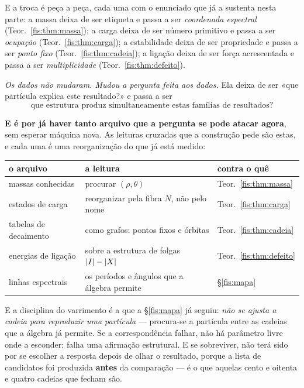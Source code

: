 \documentclass[livro.tex]{subfiles}
\begin{document}
\medskip\noindent E a troca é peça a peça, cada uma com o enunciado que já a
sustenta nesta parte: a massa deixa de ser etiqueta e passa a ser
\emph{coordenada espectral} (Teor.~\ref{fis:thm:massa}); a carga deixa de ser
número primitivo e passa a ser \emph{ocupação} (Teor.~\ref{fis:thm:carga}); a
estabilidade deixa de ser propriedade e passa a ser \emph{ponto fixo}
(Teor.~\ref{fis:thm:cadeia}); a ligação deixa de ser força acrescentada e passa a
ser \emph{multiplicidade} (Teor.~\ref{fis:thm:defeito}).

\medskip\noindent\emph{Os dados não mudaram. Mudou a pergunta feita aos dados.}
Ela deixa de ser «que partícula explica este resultado?» e passa a ser
\[
\boxed{\;\text{que estrutura produz simultaneamente estas famílias de resultados?}\;}
\]

\medskip\noindent\textbf{E é por já haver tanto arquivo que a pergunta se pode
atacar agora}, sem esperar máquina nova. As leituras cruzadas que a construção
pede são estas, e cada uma é uma reorganização do que já está medido:

\begin{center}\small
\begin{tabular}{@{}lll@{}}
\toprule
o arquivo & a leitura & contra o quê \\
\midrule
massas conhecidas & procurar $(\rho,\theta)$ & Teor.~\ref{fis:thm:massa} \\
estados de carga & reorganizar pela fibra $N$, não pelo nome & Teor.~\ref{fis:thm:carga} \\
tabelas de decaimento & como grafos: pontos fixos e órbitas & Teor.~\ref{fis:thm:cadeia} \\
energias de ligação & sobre a estrutura de folgas $\lvert I\rvert-\lvert X\rvert$ & Teor.~\ref{fis:thm:defeito} \\
linhas espectrais & os períodos e ângulos que a álgebra permite & §\ref{fis:mapa} \\
\bottomrule
\end{tabular}
\end{center}

\medskip\noindent E a disciplina do varrimento é a que a §\ref{fis:mapa} já
seguiu: \emph{não se ajusta a cadeia para reproduzir uma partícula} --- procura-se
a partícula entre as cadeias que a álgebra já permite. Se a correspondência
falhar, não há parâmetro livre onde a esconder: falha uma afirmação estrutural. E
se sobreviver, não terá sido por se escolher a resposta depois de olhar o
resultado, porque a lista de candidatos foi produzida \textbf{antes} da
comparação --- é o que aquelas cento e oitenta e quatro cadeias que fecham são.
\end{document}
